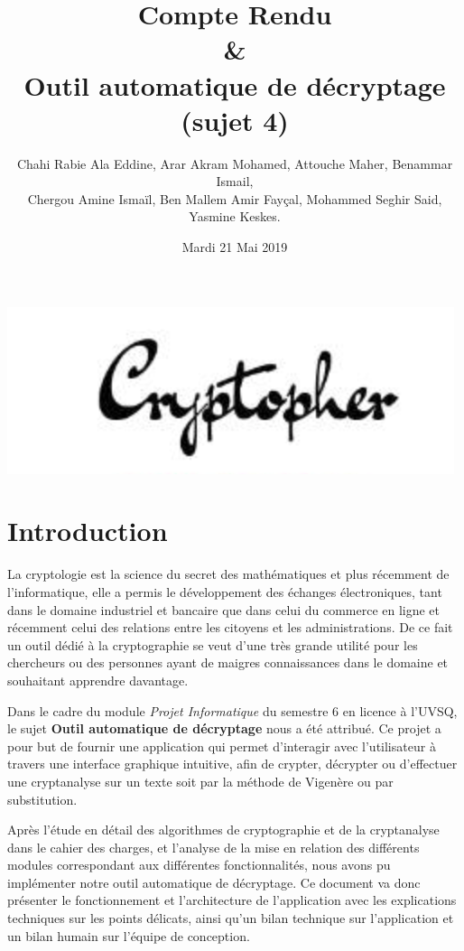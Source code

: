 \documentclass[11pt]{article}
\title{\huge{\textbf Compte Rendu \\  & \\  Outil automatique de décryptage (sujet 4)}}
\author{Chahi Rabie Ala Eddine, Arar Akram Mohamed, Attouche Maher, Benammar Ismail,\\ Chergou Amine Ismaïl, Ben Mallem Amir Fayçal, Mohammed Seghir Said, Yasmine Keskes.}
\date{Mardi 21 Mai 2019}
\begin{document}
\maketitle
    \vspace{20em}
    \begin{center}\includegraphics[scale=0.50]{pictures/logo2.png}\end{center}
    \thispagestyle{empty}
\newpage

\tableofcontents
    \thispagestyle{empty}

\newpage
\setcounter{page}{1}
\section{Introduction}

La cryptologie est la science du secret des mathématiques et plus récemment de l’informatique, elle a permis le développement des échanges électroniques, tant dans le domaine industriel et bancaire que dans celui du commerce en ligne et récemment celui des relations entre les citoyens et les administrations. De ce fait un outil dédié à la cryptographie se veut d’une très grande utilité pour les chercheurs ou des personnes ayant de maigres connaissances dans le domaine et souhaitant apprendre davantage.

Dans le cadre du module \textit{Projet Informatique} du semestre 6 en licence à l’UVSQ, le sujet \textbf{Outil automatique de décryptage} nous a été attribué.
Ce projet a pour but de fournir une application qui permet d’interagir avec l’utilisateur à travers une interface graphique intuitive, afin de crypter, décrypter ou d’effectuer une cryptanalyse sur un texte soit par la méthode de Vigenère ou par substitution.

Après l’étude en détail des algorithmes de cryptographie et de la cryptanalyse dans le cahier des charges, et l'analyse de la mise en relation des différents modules correspondant aux différentes fonctionnalités, nous avons pu implémenter notre outil automatique de décryptage. Ce document va donc présenter le fonctionnement et l’architecture de l’application avec les explications techniques  sur les points délicats, ainsi qu’un bilan technique sur l’application et un bilan humain sur l’équipe de conception.
\end{document}
